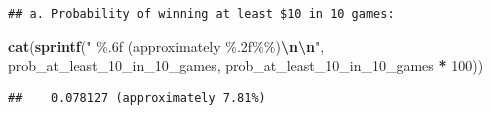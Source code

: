 \documentclass[
]{article}
\newenvironment{Shaded}{\begin{snugshade}}{\end{snugshade}}
\newcommand{\DecValTok}[1]{\textcolor[rgb]{0.00,0.00,0.81}{#1}}
\newcommand{\FunctionTok}[1]{\textcolor[rgb]{0.13,0.29,0.53}{\textbf{#1}}}
\newcommand{\NormalTok}[1]{#1}
\newcommand{\SpecialCharTok}[1]{\textcolor[rgb]{0.81,0.36,0.00}{\textbf{#1}}}
\newcommand{\StringTok}[1]{\textcolor[rgb]{0.31,0.60,0.02}{#1}}
\begin{document}
\begin{verbatim}
## a. Probability of winning at least $10 in 10 games:
\end{verbatim}

\begin{Shaded}
\begin{Highlighting}[]
\FunctionTok{cat}\NormalTok{(}\FunctionTok{sprintf}\NormalTok{(}\StringTok{"   \%.6f (approximately \%.2f\%\%)}\SpecialCharTok{\textbackslash{}n\textbackslash{}n}\StringTok{"}\NormalTok{, }
\NormalTok{            prob\_at\_least\_10\_in\_10\_games, }
\NormalTok{            prob\_at\_least\_10\_in\_10\_games }\SpecialCharTok{*} \DecValTok{100}\NormalTok{))}
\end{Highlighting}
\end{Shaded}

\begin{verbatim}
##    0.078127 (approximately 7.81%)
\end{verbatim}
\end{document}
